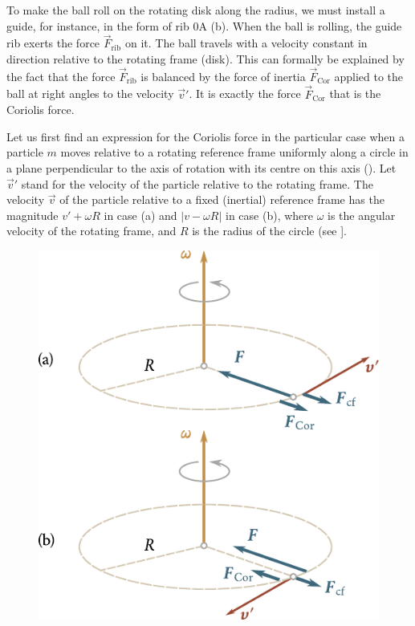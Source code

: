 To make the ball roll on the rotating disk along the radius, we must install a guide, for instance, in the form of rib $0$A (b). When the ball is rolling, the guide rib exerts the force $\vec{F}_{\text{rib}}$ on it. The ball travels with a velocity constant in direction relative to the rotating frame (disk). This can formally be explained by the fact that the force $\vec{F}_{\text{rib}}$ is balanced by the force of inertia $\vec{F}_{\text{Cor}}$ applied to the ball at right angles to the velocity $\vec{v}'$. It is exactly the force $\vec{F}_{\text{Cor}}$ that is the Coriolis force.

Let us first find an expression for the Coriolis force in the particular case when a particle $m$ moves relative to a rotating reference frame uniformly along a circle in a plane perpendicular to the axis of rotation with its centre on this axis (). Let $\vec{v}'$ stand for the velocity of the particle relative to the rotating frame. The velocity $\vec{v}$ of the particle relative to a fixed (inertial) reference frame has the magnitude $v'+\omega R$ in case (a) and $|v-\omega R|$ in case (b), where $\omega$ is the angular velocity of the rotating frame, and $R$ is the radius of the circle (see ].

\begin{figure}[t]
	\begin{center}
		\includegraphics[scale=1]{figures/ch_04/fig_4_7.pdf}
		\caption[]{}
		\label{fig:4_7}
	\end{center}
	\vspace{-0.8cm}
\end{figure}

